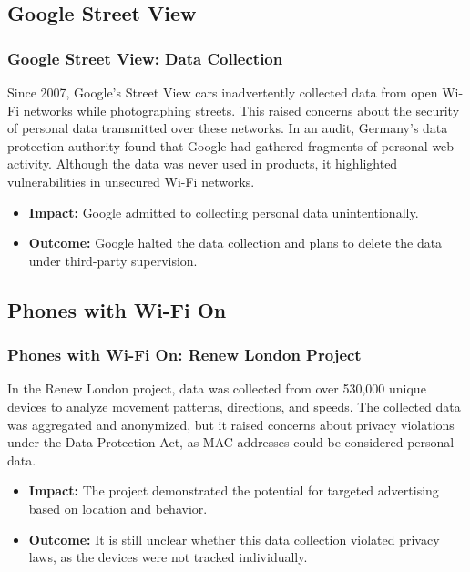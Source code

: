 \documentclass[
english,
svgnames,
notes=hide,
12pt]{beamer}
\begin{document}
\begin{frame}
  \section{Google Street View}
  \frametitle{Google Street View: Data Collection}
  Since 2007, Google's Street View cars inadvertently collected data from open Wi-Fi networks while photographing streets. This raised concerns about the security of personal data transmitted over these networks. In an audit, Germany's data protection authority found that Google had gathered fragments of personal web activity. Although the data was never used in products, it highlighted vulnerabilities in unsecured Wi-Fi networks.
  \begin{itemize}
    \item \textbf{Impact:} Google admitted to collecting personal data unintentionally. \pause
    \item \textbf{Outcome:} Google halted the data collection and plans to delete the data under third-party supervision. 
  \end{itemize}
\end{frame}

\begin{frame}
  \section{Phones with Wi-Fi On}
  \frametitle{Phones with Wi-Fi On: Renew London Project}
  In the Renew London project, data was collected from over 530,000 unique devices to analyze movement patterns, directions, and speeds. The collected data was aggregated and anonymized, but it raised concerns about privacy violations under the Data Protection Act, as MAC addresses could be considered personal data.
  \begin{itemize}
    \item \textbf{Impact:} The project demonstrated the potential for targeted advertising based on location and behavior. \pause
    \item \textbf{Outcome:} It is still unclear whether this data collection violated privacy laws, as the devices were not tracked individually. 
  \end{itemize}
\end{frame}
\end{document}
